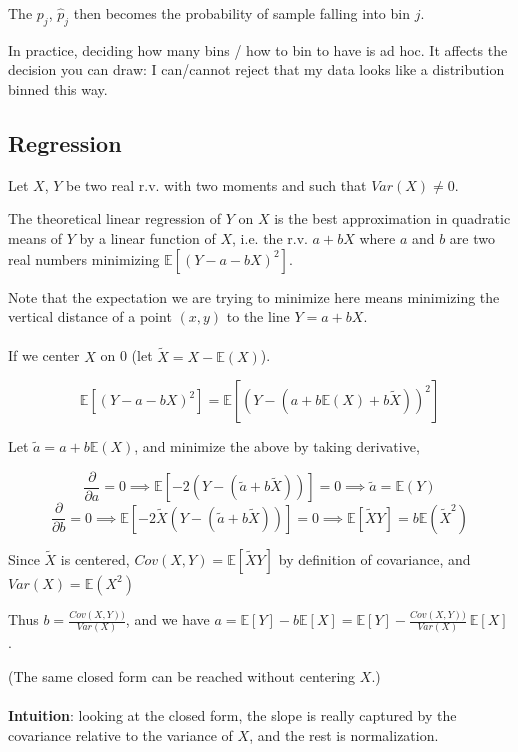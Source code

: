 \documentclass{article}
\begin{document}
The $p_j$, $\hat{p}_j$ then becomes the probability of sample falling into bin $j$.

In practice, deciding how many bins / how to bin to have is ad hoc. It affects the decision you can draw: I can/cannot reject that my data looks like a distribution binned this way.

\subsection{Regression}

Let $X$, $Y$ be two real r.v. with two moments and such that $Var(X) \neq 0$.

The theoretical linear regression of $Y$ on $X$ is the best approximation in quadratic means of $Y$ by a linear function of $X$,
i.e. the r.v. $a + bX$ where $a$ and $b$ are two real numbers minimizing $\mathbb{E}[(Y - a - bX)^2]$.

Note that the expectation we are trying to minimize here means minimizing the vertical distance of a point $(x, y)$ to the line $Y = a + bX$.
\\
\\
If we center $X$ on 0 (let $\tilde{X} = X - \mathbb{E}(X)$).

$$
\mathbb{E}[(Y - a - bX)^2] = \mathbb{E}[(Y - (a + b \mathbb{E}(X) + b \tilde{X}))^2]
$$

Let $\tilde{a} = a + b \mathbb{E}(X)$, and minimize the above by taking derivative,

$$
\frac{\partial}{\partial{a}} = 0 \implies \mathbb{E}[-2 (Y - (\tilde{a} + b \tilde{X}))] = 0 \implies \tilde{a} = \mathbb{E}(Y)
$$
$$
\frac{\partial}{\partial{b}} = 0 \implies \mathbb{E}[-2 \tilde{X} (Y - (\tilde{a} + b \tilde{X}))] = 0 \implies \mathbb{E}[\tilde{X} Y] = b \mathbb{E}(\tilde{X}^2)
$$


Since $\tilde{X}$ is centered, $ Cov(X, Y) = \mathbb{E}[\tilde{X} Y]$ by definition of covariance, and $Var(X) = \mathbb{E}(X^2)$

Thus $b = \frac{Cov(X, Y))}{Var(X)}$, and we have $a = \mathbb{E}[Y] - b \mathbb{E}[X] = \mathbb{E}[Y] - \frac{Cov(X, Y))}{Var(X)} ~ \mathbb{E}[X]$.

(The same closed form can be reached without centering $X$.)
\\
\\
\textbf{Intuition}: looking at the closed form, the slope is really captured by the covariance relative to the variance of $X$, and the rest is normalization.
\end{document}
